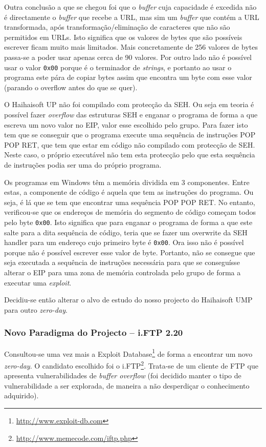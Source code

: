 \documentclass[11pt,a4paper]{article}
\begin{document}
Outra conclusão a que se chegou foi que o \textit{buffer} cuja capacidade é excedida não é directamente o \textit{buffer} que recebe a URL, mas sim um \textit{buffer} que contém a URL transformada, após transformação/eliminação de caracteres que não são permitidos em URLs. Isto significa que os valores de bytes que são possíveis escrever ficam muito mais limitados. Mais concretamente de 256 valores de bytes passa-se a poder usar apenas cerca de 90 valores. Por outro lado não é possível usar o valor \texttt{0x00} porque é o terminador de \textit{strings}, e portanto ao usar o programa este pára de copiar bytes assim que encontra um byte com esse valor (parando o overflow antes do que se quer).

O Haihaisoft UP não foi compilado com protecção da SEH. Ou seja em teoria é possível fazer \textit{overflow} das estruturas SEH e enganar o programa de forma a que escreva um novo valor no EIP, valor esse escolhido pelo grupo. Para fazer isto tem que se conseguir que o programa execute uma sequência de instruções POP POP RET, que tem que estar em código não compilado com protecção de SEH. Neste caso, o próprio executável não tem esta protecção pelo que esta sequência de instruções podia ser uma do próprio programa.

Os programas em Windows têm a memória dividida em 3 componentes. Entre estas, a componente de código é aquela que tem as instruções do programa. Ou seja, é lá que se tem que encontrar uma sequência POP POP RET. No entanto, verificou-se que os endereços de memória do segmento de código começam todos pelo byte \texttt{0x00}. Isto significa que para enganar o programa de forma a que este salte para a dita sequência de código, teria que se fazer um overwrite da SEH handler para um endereço cujo primeiro byte é \texttt{0x00}. Ora isso não é possível porque não é possível escrever esse valor de byte. Portanto, não se consegue que seja executada a sequência de instruções necessária para que se conseguísse alterar o EIP para uma zona de memória controlada pelo grupo de forma a executar uma \textit{exploit}.

Decidiu-se então alterar o alvo de estudo do nosso projecto do Haihaisoft UMP para outro \textit{zero-day}.


\subsubsection{Novo Paradigma do Projecto -- i.FTP 2.20}
Consultou-se uma vez mais a Exploit Database\footnote{\url{http://www.exploit-db.com}} de forma a encontrar um novo \textit{zero-day}. O candidato escolhido foi o i.FTP\footnote{\url{http://www.memecode.com/iftp.php}}. Trata-se de um cliente de FTP que apresenta vulnerabilidades de \textit{buffer overflow} (foi decidido manter o tipo de vulnerabilidade a ser explorada, de maneira a não desperdiçar o conhecimento adquirido).
\end{document}
